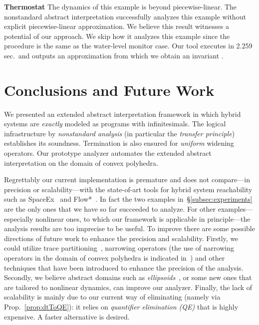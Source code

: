 \documentclass[envcountsect,orivec]{llncs} \pdfoutput=1
\theoremstyle{definition}
\begin{document}
\noindent
\textbf{Thermostat} 
The dynamics of this example is beyond piecewise-linear.
The nonstandard abstract interpretation
successfully analyzes this example without explicit piece\-wise-linear
approximation. We believe this result witnesses a potential of our approach. We skip how it analyzes this example since the procedure is the same as the water-level monitor case.
Our tool executes in 2.259 sec.\ and outputs an approximation from which 
we obtain an invariant .
 

\section{Conclusions and Future Work}






We presented an extended abstract interpretation framework in which
hybrid systems are \emph{exactly} modeled as programs with infinitesimals.
 The logical infrastructure by \emph{nonstandard analysis} (in particular
the \emph{transfer principle}) establishes its 
soundness.
Termination is also ensured for \emph{uniform} widening operators.
Our prototype analyzer automates the extended abstract interpretation on the domain of convex polyhedra.


 










Regrettably our current implementation is premature and does not
compare---in precision or scalability---with the state-of-art tools for
hybrid system reachability such as  SpaceEx~\cite{Frehse11} and Flow*~\cite{ChenAS13}.
In fact the two examples in~\S{}\ref{subsec:experiments} are the only
ones that we have so far succeeded to analyze. For other
examples---especially nonlinear ones, to which our framework is
applicable in principle---the analysis results are too imprecise to be useful.
 To improve
there are some possible directions of future work to enhance the precision and scalability.
Firstly, we could utilize trace partitioning~\cite{Mauborgne2005}, narrowing operators (the use of narrowing operators in the domain of convex polyhedra is indicated in~\cite[\S{3.4}]{Henriksen2007}) and other techniques that have been introduced to enhance the precision of the analysis.
Secondly, we believe  abstract domains such as
\emph{ellipsoids}~\cite{Feret2004}, or some new ones that are tailored
to nonlinear dynamics, 
can improve our analyzer.
Finally, the lack of scalability is mainly due to our current way of eliminating  (namely via
Prop.~\ref{prop:dtToQE}): it relies on \emph{quantifier elimination
(QE)} that is highly expensive. A faster alternative is desired. 
\end{document}
